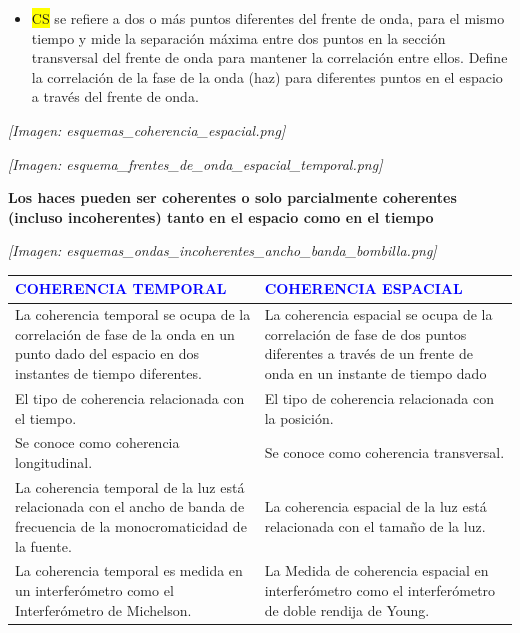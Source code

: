 \documentclass[12pt]{article}
\begin{document}
	\begin{itemize}
		\item \colorbox{yellow}{CS} se refiere a dos o más puntos diferentes del frente de onda, para el mismo tiempo y mide la separación máxima entre dos puntos en la sección transversal del frente de onda para mantener la correlación entre ellos. Define la correlación de la fase de la onda (haz) para diferentes puntos en el espacio a través del frente de onda.
	\end{itemize}
	\textit{[Imagen: esquemas\_coherencia\_espacial.png]}
	
	\textit{[Imagen: esquema\_frentes\_de\_onda\_espacial\_temporal.png]}
	
	\textbf{Los haces pueden ser coherentes o solo parcialmente coherentes (incluso incoherentes) tanto en el espacio como en el tiempo}
	
	\textit{[Imagen: esquemas\_ondas\_incoherentes\_ancho\_banda\_bombilla.png]}
	
	\begin{center}
		\renewcommand{\arraystretch}{1.5}
		\begin{tabular}{|p{}|p{}|}
			\hline
			\textbf{\textcolor{blue}{COHERENCIA TEMPORAL}} & \textbf{\textcolor{blue}{COHERENCIA ESPACIAL}} \\
			\hline
			La coherencia temporal se ocupa de la correlación de fase de la onda en un punto dado del espacio en dos instantes de tiempo diferentes. & La coherencia espacial se ocupa de la correlación de fase de dos puntos diferentes a través de un frente de onda en un instante de tiempo dado \\
			\hline
			El tipo de coherencia relacionada con el tiempo. & El tipo de coherencia relacionada con la posición. \\
			\hline
			Se conoce como coherencia longitudinal. & Se conoce como coherencia transversal. \\
			\hline
			La coherencia temporal de la luz está relacionada con el ancho de banda de frecuencia de la monocromaticidad de la fuente. & La coherencia espacial de la luz está relacionada con el tamaño de la luz. \\
			\hline
			La coherencia temporal es medida en un interferómetro como el Interferómetro de Michelson. & La Medida de coherencia espacial en interferómetro como el interferómetro de doble rendija de Young. \\
			\hline
		\end{tabular}
	\end{center}
	
\end{document}
